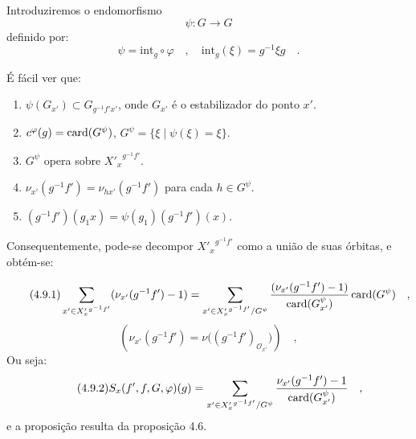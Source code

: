 \medskip

\begin{prooftext}[Demonstração]
Introduziremos o endomorfismo
\[
\psi : G \longrightarrow G
\]
definido por:
\[
\psi = \mathrm{int}_g \circ \varphi \quad , \quad \mathrm{int}_g(\xi) = g^{-1}\xi g \quad .
\]

É fácil ver que:
\begin{enumerate}
\item[i)] $\psi(G_{x'}) \subset G_{g^{-1}f'x'}$, onde $G_{x'}$ é o estabilizador do ponto $x'$.
\item[ii)] $c^\varphi(g) = \operatorname{card}(G^\psi)$, $G^\psi = \{ \xi \mid \psi(\xi) = \xi \}$.
\item[iii)] $G^\psi$ opera sobre ${X'_x}^{g^{-1}f'}$.
\item[iv)] $\nu_{x'}(g^{-1}f') = \nu_{hx'}(g^{-1}f')$ para cada $h \in G^\psi$.
\item[v)] $(g^{-1}f')(g_1x) = \psi(g_1)(g^{-1}f')(x)$.
\end{enumerate}

Consequentemente, pode-se decompor ${X'_x}^{g^{-1}f'}$ como a união de suas órbitas, e obtém-se:

\begin{equation}\tag{4.9.1}
\sum_{x' \in {X'_x}^{g^{-1}f'}} (\nu_{x'}(g^{-1}f') - 1) = \sum_{x' \in {X'_x}^{g^{-1}f'}/G^\psi} \frac{(\nu_{x'}(g^{-1}f') - 1)}{\operatorname{card}(G^\psi_{x'})} \operatorname{card}(G^\psi) \quad ,
\end{equation}
\[
(\nu_{x'}(g^{-1}f')=\nu\bigl((g^{-1}f')_{\mathcal{O}_{x'}}\bigr)) \quad ,
\]
Ou seja:
\begin{equation}\tag{4.9.2}
S_x(f',f,G,\varphi)(g)=\sum_{x' \in {X'_x}^{g^{-1}f'}/G^\psi}
\frac{\nu_{x'}(g^{-1}f')-1}{\operatorname{card}(G^\psi_{x'})} \quad ,
\end{equation}
e a proposição resulta da proposição 4.6.
\end{prooftext}

